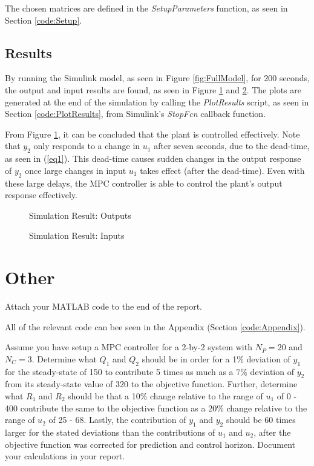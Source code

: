 \documentclass[12pt]{article}
\newenvironment{problem}[2][Problem]{\begin{trivlist}
		\item[\hskip \labelsep {\bfseries #1}\hskip \labelsep {\bfseries #2.}]}{\end{trivlist}}
\begin{document}
The chosen matrices are defined in the \textit{SetupParameters} function, as seen in Section \ref{code:Setup}.

\subsection{Results}
\label{sec:Results}

By running the Simulink model, as seen in Figure \ref{fig:FullModel}, for 200 seconds, the output and input results are found, as seen in Figure \ref{fig:Outputs} and \ref{fig:Inputs}. The plots are generated at the end of the simulation by calling the \textit{PlotResults} script, as seen in Section \ref{code:PlotResults}, from Simulink's \textit{StopFcn} callback function.

From Figure \ref{fig:Outputs}, it can be concluded that the plant is controlled effectively. Note that $y_2$ only responds to a change in $u_1$ after seven seconds, due to the dead-time, as seen in (\ref{eq1}). This dead-time causes sudden changes in the output response of $y_2$ once large changes in input $u_1$ takes effect (after the dead-time). Even with these large delays, the MPC controller is able to control the plant's output response effectively.

\begin{figure}[H]
	
	\centering
	\caption{Simulation Result: Outputs}
	\label{fig:Outputs}
\end{figure}

\begin{figure}[h!]
	
	\centering
	\caption{Simulation Result: Inputs}
	\label{fig:Inputs}
\end{figure}

\section{Other}

\begin{problem}{11} Attach your MATLAB code to the end of the report. \end{problem}

All of the relevant code can bee seen in the Appendix (Section \ref{code:Appendix}).

\begin{problem}{12} Assume you have setup a MPC controller for a 2-by-2 system with $N_P=20$ and $N_C=3$. Determine what $Q_1$ and $Q_2$ should be in order for a 1\% deviation of $y_1$ for the steady-state of 150 to contribute 5 times as much as a 7\% deviation of $y_2$ from its steady-state value of 320 to the objective function. Further, determine what $R_1$ and $R_2$ should be that a 10\% change relative to the range of $u_1$ of 0 - 400 contribute the same to the objective function as a 20\% change relative to the range of $u_2$ of 25 - 68. Lastly, the contribution of $y_1$ and $y_2$ should be 60 times larger for the stated deviations than the contributions of $u_1$ and $u_2$, after the objective function was corrected for prediction and control horizon. Document your calculations in your report. \end{problem}
\end{document}
